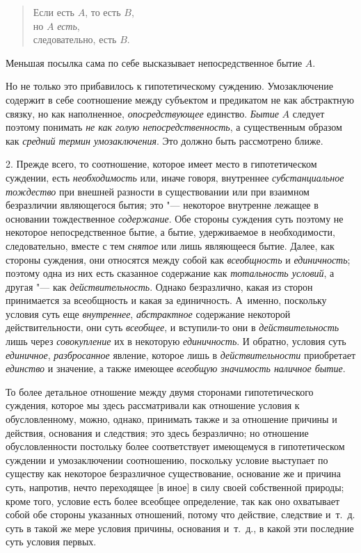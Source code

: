 {{\begin{verse}
Если есть $A$, то есть $B$,\\
но $A$ {\em есть},\\
следовательно, есть $B$.
\end{verse}

Меньшая посылка сама по себе высказывает непосредственное бытие $A$.

Но не только это прибавилось к гипотетическому суждению.
Умозаключение содержит в себе соотношение между субъектом и предикатом не
как абстрактную связку, но как наполненное, {\em опосредствующее}
единство. {\em Бытие} $A$ следует поэтому понимать
{\em не как голую непосредственность}, а существенным образом как
{\em средний термин умозаключения}. Это должно быть рассмотрено ближе.

2. Прежде всего, то соотношение, которое имеет место в
гипотетическом суждении, есть {\em необходимость} или,
иначе говоря, внутреннее {\em субстанциальное тождество}
при внешней разности в существовании или при
взаимном безразличии являющегося бытия; это "--- некоторое
внутренне лежащее в основании тождественное {\em содержание}. Обе
стороны суждения суть поэтому не некоторое непосредственное бытие, а бытие,
удерживаемое в необходимости, следовательно, вместе с тем {\em снятое} или лишь
являющееся бытие. Далее, как стороны суждения, они относятся между собой
как {\em всеобщность} и {\em единичность};
поэтому одна из них есть сказанное содержание как
{\em тотальность условий}, а другая "--- как {\em действительность}.
Однако безразлично, какая из сторон принимается за
всеобщность и какая за единичность. А~именно, поскольку условия суть еще
{\em внутреннее}, {\em абстрактное}
содержание некоторой действительности, они суть
{\em всеобщее}, и вступили-то они в {\em действительность}
лишь через {\em совокупление} их в некоторую {\em единичность}.
И обратно, условия суть {\em единичное}, {\em разбросанное}
явление, которое лишь в {\em действительности} приобретает {\em единство} и
значение, а также имеющее {\em всеобщую значимость наличное бытие}.

То более детальное отношение между двумя сторонами
гипотетического суждения, которое мы здесь рассматривали как отношение
условия к обусловленному, можно, однако, принимать также и за отношение
причины и действия, основания и следствия; это здесь безразлично; но
отношение обусловленности постольку более соответствует имеющемуся в
гипотетическом суждении и умозаключении соотношению, поскольку условие
выступает по существу как некоторое безразличное существование, основание
же и причина суть, напротив, нечто переходящее [в иное] в силу своей
собственной природы; кроме того, условие есть более всеобщее определение,
так как оно охватывает собой обе стороны указанных отношений, потому что
действие, следствие и~т.~д. суть в такой же мере условия причины, основания
и~т.~д., в какой эти последние суть условия первых.

}}
